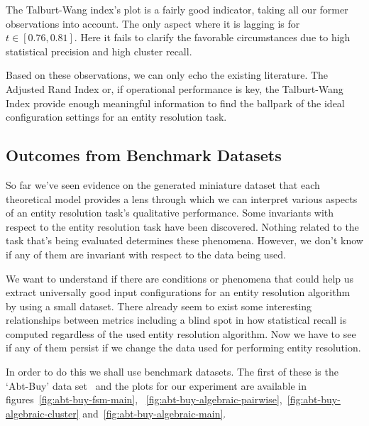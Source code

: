 The Talburt-Wang index's plot is a fairly good indicator, taking all our former
observations into account.
The only aspect where it is lagging is for $t\in\left[0.76,0.81\right]$.
Here it fails to clarify the favorable circumstances due to high statistical
precision and high cluster recall.

Based on these observations, we can only echo the existing literature.
The Adjusted Rand Index or, if operational performance is key, the Talburt-Wang
Index provide enough meaningful information to find the ballpark of the ideal
configuration settings for an entity resolution task.

\subsection{Outcomes from Benchmark Datasets}\label{subsec:experiment-benchmark}

So far we've seen evidence on the generated miniature dataset that each
theoretical model provides a lens through which we can interpret various aspects
of an entity resolution task's qualitative performance.
Some invariants with respect to the entity resolution task have been discovered.
Nothing related to the task that's being evaluated determines these phenomena.
However, we don't know if any of them are invariant with respect to the data
being used.

We want to understand if there are conditions or phenomena that could help us
extract universally good input configurations for an entity resolution algorithm
by using a small dataset.
There already seem to exist some interesting relationships between metrics
including a blind spot in how statistical recall is computed regardless of the
used entity resolution algorithm.
Now we have to see if any of them persist if we change the data used for
performing entity resolution.

In order to do this we shall use benchmark datasets.
The first of these is the `Abt-Buy' data set~\cite{vldb2010} and the plots for
our experiment are available in figures~\ref{fig:abt-buy-fsm-main},
~\ref{fig:abt-buy-algebraic-pairwise},~\ref{fig:abt-buy-algebraic-cluster}
and~\ref{fig:abt-buy-algebraic-main}.

